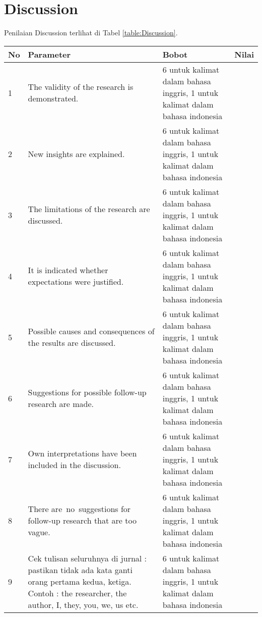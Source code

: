 \section{Discussion}

Penilaian Discussion terlihat di Tabel \ref{table:Discussion}.
\begin{longtable}{|p{}|p{}|p{}|p{}|}
\hline
No&Parameter&Bobot&Nilai\\
\hline

1 &The validity of the research is demonstrated. & 6 untuk kalimat dalam bahasa inggris, 1 untuk kalimat dalam bahasa indonesia& \\ \hline

2 &New insights are explained. & 6 untuk kalimat dalam bahasa inggris, 1 untuk kalimat dalam bahasa indonesia & \\ \hline

3 &The limitations of the research are discussed.& 6 untuk kalimat dalam bahasa inggris, 1 untuk kalimat dalam bahasa indonesia & \\ \hline

4 &It is indicated whether expectations were justified. & 6 untuk kalimat dalam bahasa inggris, 1 untuk kalimat dalam bahasa indonesia & \\ \hline

5 &Possible causes and consequences of the results are discussed. & 6 untuk kalimat dalam bahasa inggris, 1 untuk kalimat dalam bahasa indonesia & \\ \hline

6 &Suggestions for possible follow-up research are made. & 6 untuk kalimat dalam bahasa inggris, 1 untuk kalimat dalam bahasa indonesia & \\ \hline

7 &Own interpretations have been included in the discussion. & 6 untuk kalimat dalam bahasa inggris, 1 untuk kalimat dalam bahasa indonesia & \\ \hline

8 &There are no suggestions for follow-up research that are too vague. & 6 untuk kalimat dalam bahasa inggris, 1 untuk kalimat dalam bahasa indonesia & \\ \hline

9 &Cek tulisan seluruhnya di jurnal : pastikan tidak ada kata ganti orang pertama kedua, ketiga. Contoh : the researcher, the author, I, they, you, we, us etc. & 6 untuk kalimat dalam bahasa inggris, 1 untuk kalimat dalam bahasa indonesia & \\ \hline


\end{longtable}
